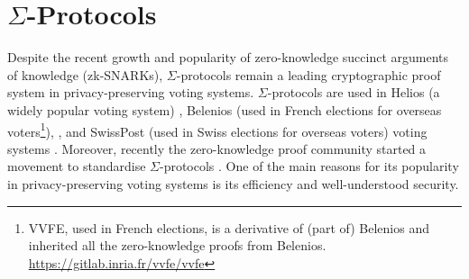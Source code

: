 \section{$\Sigma$-Protocols}\label{sigma_protocol}
Despite the recent growth and popularity of zero-knowledge succinct 
arguments of knowledge (zk-SNARKs), $\Sigma$-protocols remain a
leading cryptographic proof system in privacy-preserving voting systems. 
$\Sigma$-protocols are used in Helios (a widely popular voting system) \cite{adida2008helios}, 
Belenios (used in French elections for overseas 
voters\footnote{VVFE, used in French elections, is a derivative of (part of) Belenios and 
inherited all the zero-knowledge proofs from Belenios. \url{https://gitlab.inria.fr/vvfe/vvfe}}), \cite{cortier2023french}, and 
SwissPost (used in Swiss elections for overseas voters) voting 
systems \cite{10.1007/978-3-031-15911-4_4}. 
Moreover, recently the zero-knowledge proof community started a movement to standardise
$\Sigma$-protocols \cite{ZKProof}.
One of the main reasons for its popularity in privacy-preserving voting systems is its
efficiency and well-understood security.


